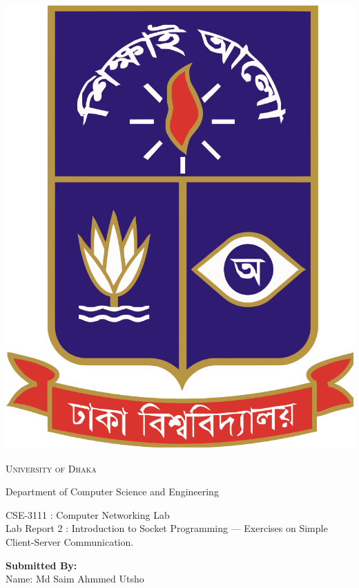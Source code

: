 \documentclass[11pt]{article}
\begin{document}
\begin{titlepage}
	\begin{center}
    	\includegraphics[scale=0.10]{du.png}\par
		\begin{Huge}
			\textsc{University of Dhaka}\par
		\end{Huge}
		\begin{Large}
			Department of Computer Science and Engineering\par \vspace{1cm}
			CSE-3111 : Computer Networking Lab \\[12pt]	
			Lab Report 2 : Introduction to Socket Programming — Exercises on Simple Client-Server Communication.
		\end{Large}
	\end{center}  	
	\begin{large}
		\textbf{Submitted By:\\[12pt]}
			Name: Md Saim Ahmmed Utsho\\[8pt]

\end{large}
\end{titlepage}
\end{document}
